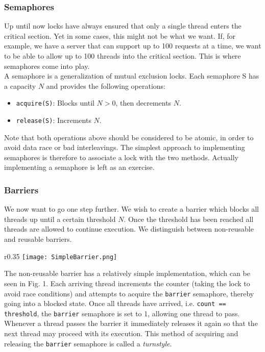 \documentclass[main]{subfiles}
\begin{document}

\subsubsection{Semaphores}
Up until now locks have always ensured that only a single thread enters the critical section. Yet in some cases, this might not be what we want. If, for example, we have a server that can support up to 100 requests at a time, we want to be able to allow up to 100 threads into the critical section. This is where semaphores come into play.\\[3mm]
A semaphore is a generalization of mutual exclusion locks. Each semaphore S has a capacity $N$ and provides the following operations:
\begin{itemize}
    \item \texttt{acquire(S)}: Blocks until $N > 0$, then decrements $N$.
    \item \texttt{release(S)}: Increments $N$.
\end{itemize}
Note that both operations above should be considered to be atomic, in order to avoid data race or bad interleavings. The simplest approach to implementing semaphores is therefore to associate a lock with the two methods. Actually implementing a semaphore is left as an exercise.


\subsubsection{Barriers}
We now want to go one step further. We wish to create a barrier which blocks all threads up until a certain threshold $N$. Once the threshold has been reached all threads are allowed to continue execution. We distinguish between non-reusable and reusable barriers. \\[3mm]

\begin{wrapfigure}{r}{0.35\textwidth} %
    \centering
    \vspace{-20pt}
    \texttt{[image: SimpleBarrier.png]}
\end{wrapfigure}
\vspace{-10pt}
\noindent The non-reusable barrier has a relatively simple implementation, which can be seen in Fig. 1. Each arriving thread increments the counter (taking the lock to avoid race conditions) and attempts to acquire the \texttt{barrier} semaphore, thereby going into a blocked state. Once all threads have arrived, i.e. \texttt{count == threshold}, the \texttt{barrier} semaphore is set to 1, allowing one thread to pass. Whenever a thread passes the barrier it immediately releases it again so that the next thread may proceed with its execution. This method of acquiring and releasing the \texttt{barrier} semaphore is called a \textit{turnstyle}.\\[3mm]
\end{document}
